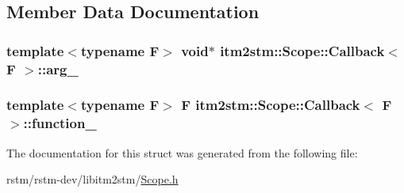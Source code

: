\subsection{Member Data Documentation}
\hypertarget{structitm2stm_1_1Scope_1_1Callback_aca985326958a4925f1891baff8c8aadb}{
\subsubsection[{arg\-\_\-}]{\setlength{\rightskip}{0pt plus 5cm}template$<$typename F$>$ void$\ast$ {\bf itm2stm\-::\-Scope\-::\-Callback}$<$ F $>$\-::arg\-\_\-}}\label{structitm2stm_1_1Scope_1_1Callback_aca985326958a4925f1891baff8c8aadb}
\hypertarget{structitm2stm_1_1Scope_1_1Callback_a7c2595062b0f5e20526c68ee32491bef}{
\subsubsection[{function\-\_\-}]{\setlength{\rightskip}{0pt plus 5cm}template$<$typename F$>$ F {\bf itm2stm\-::\-Scope\-::\-Callback}$<$ F $>$\-::function\-\_\-}}\label{structitm2stm_1_1Scope_1_1Callback_a7c2595062b0f5e20526c68ee32491bef}


The documentation for this struct was generated from the following file\-:\begin{DoxyCompactItemize}
\item 
rstm/rstm-\/dev/libitm2stm/\hyperlink{Scope_8h}{Scope.\-h}\end{DoxyCompactItemize}
